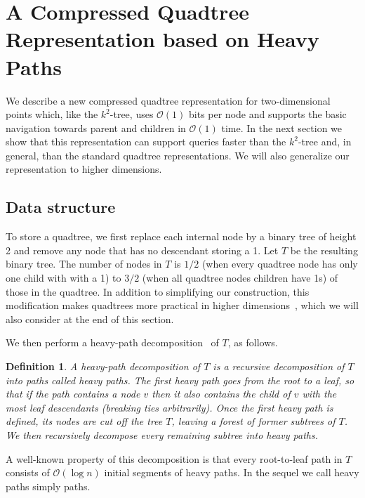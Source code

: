 \documentclass{elsarticle}
\newtheorem{definition}{Definition}
\newcommand{\Oh}[1]
  {\ensuremath{\mathcal{O}\!\left( {#1} \right)}}
\begin{document}
\section{A Compressed Quadtree Representation based on Heavy Paths}
\label{sec:structure}



We describe a new compressed quadtree representation for two-dimensional points which, like the $k^2$-tree, uses $\Oh{1}$ bits per node and supports the basic navigation towards parent and children in $\Oh{1}$ time. In the next section we show that this representation can support queries faster than the $k^2$-tree and, in general, than the standard quadtree representations. We will also generalize our representation to higher dimensions.

\subsection{Data structure}

To store a quadtree, we first replace each internal node by a binary tree of height 2 and remove any node that has no descendant storing a 1. Let $T$ be the resulting binary tree. The number of nodes in $T$ is $1/2$ (when every quadtree node has only one child with with a 1) to $3/2$ (when all quadtree nodes children have 1s) of those in the quadtree. In addition to simplifying our construction, this modification makes quadtrees more practical in higher dimensions~\cite{BDNR14}, which we will also consider at the end of this section.

We then perform a heavy-path decomposition~\cite{ST83} of $T$, as follows.

\begin{definition}
A heavy-path decomposition of $T$ is a recursive decomposition of $T$ into paths called {\em heavy paths}. The first heavy path goes from the root to a leaf, so that if the path contains a node $v$ then it also contains the child of $v$ with the most leaf descendants (breaking ties arbitrarily). Once the first heavy path is defined, its nodes are cut off the tree $T$, leaving a forest of former subtrees of $T$. We then recursively decompose every remaining subtree into heavy paths.
\end{definition}

A well-known property of this decomposition is that every root-to-leaf path in $T$ consists of $\Oh{\log n}$ initial segments of heavy paths. 
In the sequel we call heavy paths simply paths.
\end{document}
